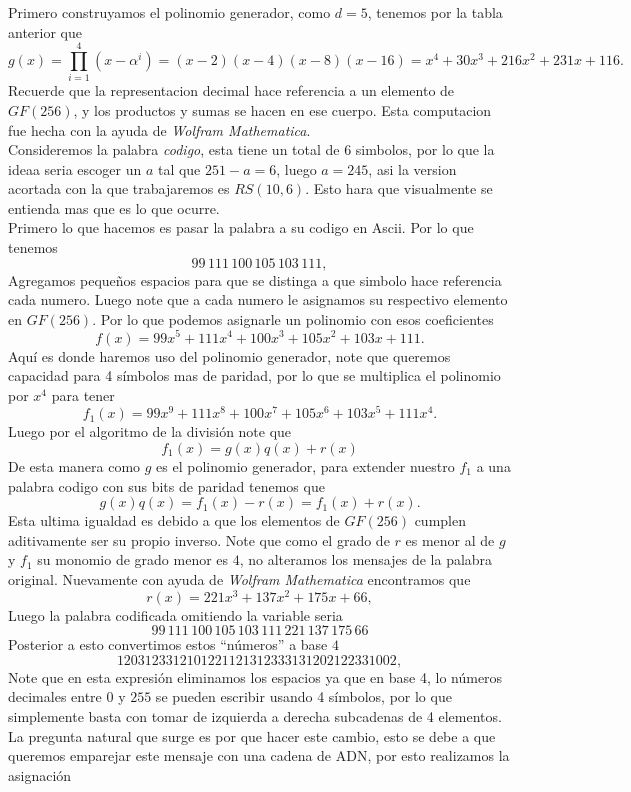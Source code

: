 Primero construyamos el polinomio generador, como $d=5$, tenemos por la tabla anterior que
$$g(x)=\prod_{i=1}^4(x-\alpha^i)=(x-2)(x-4)(x-8)(x-16)=x^4+30x^3+216x^2+231x+116.$$
Recuerde que la representacion decimal hace referencia a un elemento de $GF(256)$, y los productos y sumas se hacen en ese cuerpo. Esta computacion fue hecha con la ayuda de \textit{Wolfram Mathematica}.\\

Consideremos la palabra \textit{codigo}, esta tiene un total de $6$ simbolos, por lo que la ideaa seria escoger un $a$ tal que $251-a=6$, luego $a=245$, asi la version acortada con la que trabajaremos es $RS(10,6)$. Esto hara que visualmente se entienda mas que es lo que ocurre.\\

Primero lo que hacemos es pasar la palabra a su codigo en Ascii. Por lo que tenemos
$$99\,111\,100\,105\,103\,111,$$
Agregamos pequeños espacios para que se distinga a que simbolo hace referencia cada numero. Luego note que a cada numero le asignamos su respectivo elemento en $GF(256).$ Por lo que podemos asignarle un polinomio con esos coeficientes
$$f(x)=99x^5+111x^4+100x^3+105x^2+103x+111.$$
Aquí es donde haremos uso del polinomio generador, note que queremos capacidad para 4 símbolos mas de paridad, por lo que se multiplica el polinomio por $x^4$ para tener
$$f_1(x)=99x^9+111x^8+100x^7+105x^6+103x^5+111x^4.$$
Luego por el algoritmo de la división note que
$$f_1(x)=g(x)q(x)+r(x)$$
De esta manera como $g$ es el polinomio generador, para extender nuestro $f_1$ a una palabra codigo con sus bits de paridad tenemos que
$$g(x)q(x)=f_1(x)-r(x)=f_1(x)+r(x).$$
Esta ultima igualdad es debido a que los elementos de $GF(256)$ cumplen aditivamente ser su propio inverso. Note que como el grado de $r$ es menor al de $g$ y $f_1$ su monomio de grado menor es $4$, no alteramos los mensajes de la palabra original. Nuevamente con ayuda de \textit{Wolfram Mathematica} encontramos que
$$r(x)=221x^3+137x^2+175x+66,$$
Luego la palabra codificada omitiendo la variable seria
$$99\,111\,100\,105\,103\,111\,221\,137\,175\,66$$
Posterior a esto convertimos estos ``números'' a base $4$
$$1203123312101221121312333131202122331002,$$
Note que en esta expresión eliminamos los espacios ya que en base 4, lo números decimales entre $0$ y $255$ se pueden escribir usando 4 símbolos, por lo que simplemente basta con tomar de izquierda a derecha subcadenas de 4 elementos.\\
La pregunta natural que surge es por que hacer este cambio, esto se debe a que queremos emparejar este mensaje con una cadena de ADN, por esto realizamos la asignación
